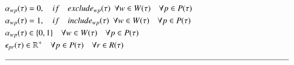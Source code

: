 {\begin{alignat}{2}
		& \VarStrategicWorkOrderAssignment{\ElementWorkOrder}{\ElementPeriod} = 0,                                                     \quad if\quad \ParStrategicExclude \ \ \forall \ElementWorkOrder \in \SetWorkOrder{}\quad \forall \ElementPeriod \in \SetPeriod                                                                                                                                                                                              \label{eqn:constraint:strategic:include}\\
		& \VarStrategicWorkOrderAssignment{\ElementWorkOrder}{\ElementPeriod} = 1,                                                            \quad if\quad \ParStrategicInclude \ \ \forall \ElementWorkOrder \in \SetWorkOrder{}\quad \forall \ElementPeriod \in \SetPeriod                                                                                                                                                                                              \label{eqn:strategic:constraint:exclude}\\
		& \VarStrategicWorkOrderAssignment{\ElementWorkOrder}{\ElementPeriod} \in \{0, 1\}                                                   \quad \forall \ElementWorkOrder \in \SetWorkOrder{} \quad \forall \ElementPeriod \in \SetPeriod                                                                                                                                                                           \label{eqn:variable:strategic:assignment}      \\ 
		& \VarStrategicExcess \in \mathbb{R}^{+}                                                                                             \quad \forall \ElementPeriod \in \SetPeriod \quad \forall \ElementResource \in \SetResource                                                                                                                                                                               \label{eqn:variable:strateigc:penalty}\\ 
		& \text{\rule{\linewidth}{0.4pt}} \notag
	\end{alignat}
}
